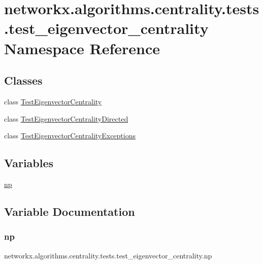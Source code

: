\hypertarget{namespacenetworkx_1_1algorithms_1_1centrality_1_1tests_1_1test__eigenvector__centrality}{}\section{networkx.\+algorithms.\+centrality.\+tests.\+test\+\_\+eigenvector\+\_\+centrality Namespace Reference}
\label{namespacenetworkx_1_1algorithms_1_1centrality_1_1tests_1_1test__eigenvector__centrality}
\subsection*{Classes}
\begin{DoxyCompactItemize}
\item 
class \hyperlink{classnetworkx_1_1algorithms_1_1centrality_1_1tests_1_1test__eigenvector__centrality_1_1TestEigenvectorCentrality}{Test\+Eigenvector\+Centrality}
\item 
class \hyperlink{classnetworkx_1_1algorithms_1_1centrality_1_1tests_1_1test__eigenvector__centrality_1_1TestEigenvectorCentralityDirected}{Test\+Eigenvector\+Centrality\+Directed}
\item 
class \hyperlink{classnetworkx_1_1algorithms_1_1centrality_1_1tests_1_1test__eigenvector__centrality_1_1TestEigenvectorCentralityExceptions}{Test\+Eigenvector\+Centrality\+Exceptions}
\end{DoxyCompactItemize}
\subsection*{Variables}
\begin{DoxyCompactItemize}
\item 
\hyperlink{namespacenetworkx_1_1algorithms_1_1centrality_1_1tests_1_1test__eigenvector__centrality_aac5f58b1e11d25fd06e7968f43b4b4e2}{np}
\end{DoxyCompactItemize}


\subsection{Variable Documentation}
\mbox{\label{namespacenetworkx_1_1algorithms_1_1centrality_1_1tests_1_1test__eigenvector__centrality_aac5f58b1e11d25fd06e7968f43b4b4e2}} 
\subsubsection{\texorpdfstring{np}{np}}
{\footnotesize\ttfamily networkx.\+algorithms.\+centrality.\+tests.\+test\+\_\+eigenvector\+\_\+centrality.\+np}

